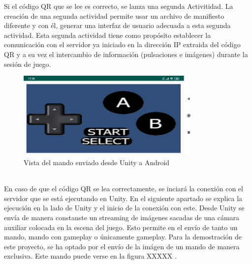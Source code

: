Si el c\'odigo QR que se lee es correcto, se lanza una segunda Activitidad. La creaci\'on de una segunda actividad permite usar un archivo de manifiesto diferente y con \'el, generar una interfaz de usuario adecuada a esta segunda actividad. Esta segunda actividad tiene como prop\'osito establecer la comunicaci\'on con el servidor ya iniciado en la direcci\'on IP extraida del c\'odigo QR y a su vez el intercambio de informaci\'on (pulsaciones e im\'agenes) durante la sesi\'on de juego.
\\
\begin{figure}[h]
\centering
\includegraphics[width=0.8\textwidth]{Imagenes/Bitmap/Mando.png}
\caption{Vista del mando enviado desde Unity a Android}
 \label{Mando}
\end{figure}
\\
En caso de que el c\'odigo QR se lea correctamente, se inciar\'a la conexi\'on con el servidor que se est\'a ejecutando en Unity. En el siguiente apartado se explica la ejecuci\'on en la lado de Unity y el inicio de la conexi\'on con este. Desde Unity se env\'ia de manera constanste un streaming de im\'agenes sacadas de una c\'amara auxiliar colocada en la escena del juego. Esto permite en el env\'io de tanto un mando, mando con gameplay o \'unicamente gameplay. Para la demostraci\'on de este proyecto, se ha optado por el env\'io de la im\'agen de un mando de manera exclusiva. Este mando puede verse en la figura XXXXX . 
\\

